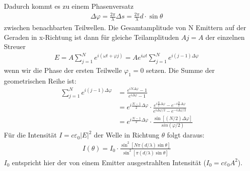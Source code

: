 \documentclass[a4paper, 11pt, ngerman, parskip=half-]{scrartcl}
\begin{document}
    Dadurch kommt es zu einem Phasenversatz
    \begin{align*}
        \Delta \varphi = \frac{2 \pi}{\lambda} \Delta s = \frac{2 \pi}{\lambda} d \cdot \sin \theta
    \end{align*}
    zwischen benachbarten Teilwellen.
    Die Gesamtamplitude von N Emittern auf der Geraden in x-Richtung ist dann für gleiche Teilamplituden $Aj = A$ der einzelnen Streuer
    \begin{align*}
        E = A \sum_{j=1}^{N} e^{i (\omega t + \varphi j)} = A e^{i \omega t} \sum_{j=1}^{N} e^{i (j -1) \Delta \varphi}
    \end{align*}
    wenn wir die Phase der ersten Teilwelle $\varphi_1 = 0$ setzen. Die
    Summe der geometrischen Reihe ist:
    \begin{align*}
        \sum_{j=1}^{N} e^{i (j -1) \Delta \varphi} & = \frac{e^{i N \Delta \varphi} - 1}{e^{i \Delta \varphi} - 1}                                                                                                                 \\
                                                   & = e^{i \frac{N-1}{2} \Delta \varphi} \cdot \frac{e^{i \frac{N}{2} \Delta \varphi} - e^{-i \frac{N}{2} \Delta \varphi}}{e^{i \Delta \varphi / 2} - e^{- i \Delta \varphi / 2}} \\
                                                   & = e^{i \frac{N-1}{2} \Delta \varphi} \cdot \frac{\sin [(N/2) \Delta \varphi]}{sin(\varphi/2)}
    \end{align*}
    Für die Intensität $I = c \varepsilon_0 |E|^2$ der Welle in Richtung $\theta$ folgt daraus:
    \begin{align*}
        I(\theta) = I_0 \cdot \frac{\sin^2[N \pi (d/\lambda) \sin\theta]}{\sin^2[\pi (d/\lambda)\sin \theta]}
    \end{align*}
$I_0$ entspricht hier der von einem Emitter ausgestrahlten Intensität ($I_0 = c \varepsilon_0 A^2$).
\end{document}
